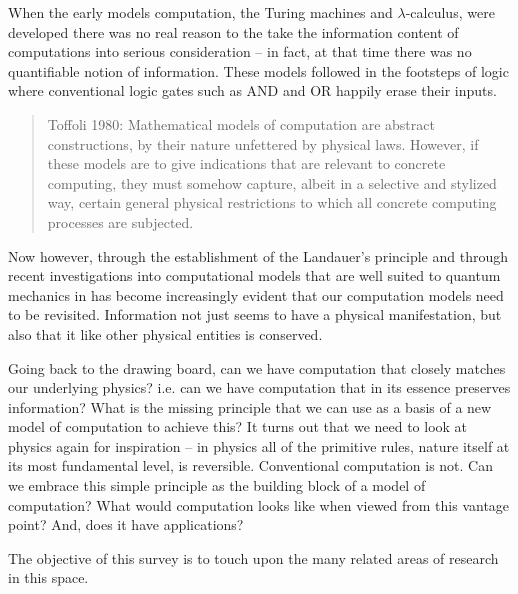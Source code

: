 \documentclass[12pt]{article}
\newcommand{\jc}[1]{\fbox{Jacques says:} \textbf{#1}}
\begin{document}
When the early models computation, the Turing machines and
$\lambda$-calculus, were developed there was no real reason to the
take the information content of computations into serious
consideration -- in fact, at that time there was no quantifiable
notion of information. These models followed in the footsteps of logic
where conventional logic gates such as AND and OR happily erase their
inputs.

\begin{quote}
Toffoli 1980: Mathematical models of computation are abstract
constructions, by their nature unfettered by physical laws. However,
if these models are to give indications that are relevant to concrete
computing, they must somehow capture, albeit in a selective and
stylized way, certain general physical restrictions to which all
concrete computing processes are subjected.
\end{quote}

Now however, through the establishment of the Landauer's principle and
through recent investigations into computational models that are well
suited to quantum mechanics in has become increasingly evident that
our computation models need to be revisited. Information not just
seems to have a physical manifestation, but also that it like other
physical entities is conserved.

Going back to the drawing board, can we have computation that closely
matches our underlying physics?  i.e. can we have computation that in
its essence preserves information? What is the missing principle that
we can use as a basis of a new model of computation to achieve this?
It turns out that we need to look at physics again for inspiration --
in physics all of the primitive rules, nature itself at its most
fundamental level, is reversible. Conventional computation is not. Can
we embrace this simple principle as the building block of a model of
computation? What would computation looks like when viewed from this
vantage point? And, does it have applications?

The objective of this survey is to touch upon the many related areas
of research in this space.




\end{document}
